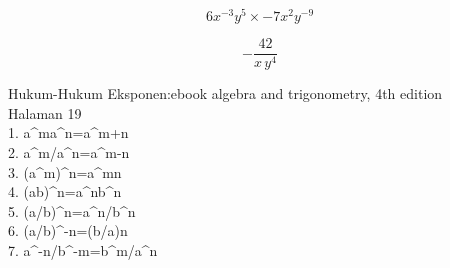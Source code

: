 \documentclass{article}
\newenvironment{eulernotebook}{\par}{\par}
\newenvironment{eulercomment}{\par\medskip}{\par\medskip}
\newenvironment{eulerformula}{}{}
\begin{document}
\begin{eulernotebook}
\begin{eulercomment}
\end{eulercomment}
\begin{eulerformula}
\[
6x^{-3}y^5\times -7x^2y^{-9}
\]
\end{eulerformula}
\begin{eulercomment}
\end{eulercomment}
\begin{eulerformula}
\[
-\frac{42}{x\,y^4}
\]
\end{eulerformula}
\begin{eulercomment}
Hukum-Hukum Eksponen:ebook algebra and trigonometry, 4th edition\\
Halaman 19\\
1. a\textasciicircum{}ma\textasciicircum{}n=a\textasciicircum{}m+n\\
2. a\textasciicircum{}m/a\textasciicircum{}n=a\textasciicircum{}m-n\\
3. (a\textasciicircum{}m)\textasciicircum{}n=a\textasciicircum{}mn\\
4. (ab)\textasciicircum{}n=a\textasciicircum{}nb\textasciicircum{}n\\
5. (a/b)\textasciicircum{}n=a\textasciicircum{}n/b\textasciicircum{}n\\
6. (a/b)\textasciicircum{}-n=(b/a)n\\
7. a\textasciicircum{}-n/b\textasciicircum{}-m=b\textasciicircum{}m/a\textasciicircum{}n


\end{eulercomment}
\end{eulernotebook}
\end{document}
